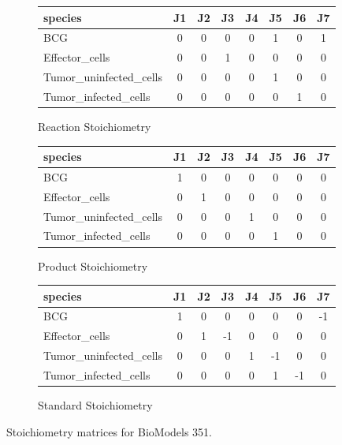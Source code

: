 \documentclass{article}
\begin{document}
\begin{figure}
\centering
\begin{subfigure}{0.7\textwidth}
{\tiny
\begin{tabular}{|l||c|c|c|c|c|c|c|}
\hline
{\bf species} & {\bf J1} & {\bf J2} & {\bf J3} & {\bf J4} & {\bf J5} & {\bf J6} & {\bf J7} \\
\hline\hline
BCG & 0 & 0 & 0 & 0 & 1 & 0 & 1\\
Effector\_cells & 0 & 0 & 1 & 0 & 0 & 0 & 0\\
Tumor\_uninfected\_cells & 0 & 0 & 0 & 0 & 1 & 0 & 0\\
Tumor\_infected\_cells & 0 & 0 & 0 & 0 & 0 & 1 & 0\\
\hline
\end{tabular}
}
    \caption{Reaction Stoichiometry}
    \label{fig:biomodels1034}
\end{subfigure}
\begin{subfigure}{0.7\textwidth}
\vspace{10pt}
{\tiny
\begin{tabular}{|l||c|c|c|c|c|c|c|}
\hline
{\bf species} & {\bf J1} & {\bf J2} & {\bf J3} & {\bf J4} & {\bf J5} & {\bf J6} & {\bf J7} \\
\hline\hline
BCG & 1 & 0 & 0 & 0 & 0 & 0 & 0\\
Effector\_cells & 0 & 1 & 0 & 0 & 0 & 0 & 0\\
Tumor\_uninfected\_cells & 0 & 0 & 0 & 1 & 0 & 0 & 0\\
Tumor\_infected\_cells & 0 & 0 & 0 & 0 & 1 & 0 & 0\\
\hline
\end{tabular}
}
 \caption{Product Stoichiometry}
\end{subfigure}
\begin{subfigure}{0.7\textwidth}
\vspace{10pt}
{\tiny
\begin{tabular}{|l||c|c|c|c|c|c|c|}
\hline
{\bf species} & {\bf J1} & {\bf J2} & {\bf J3} & {\bf J4} & {\bf J5} & {\bf J6} & {\bf J7} \\
\hline\hline
BCG & 1 & 0 & 0 & 0 & 0 & 0 & -1\\
Effector\_cells & 0 & 1 & -1 & 0 & 0 & 0 & 0\\
Tumor\_uninfected\_cells & 0 & 0 & 0 & 1 & -1 & 0 & 0\\
Tumor\_infected\_cells & 0 & 0 & 0 & 0 & 1 & -1 & 0\\
\hline
\end{tabular}
}
 \caption{Standard Stoichiometry}
\end{subfigure}
\caption{Stoichiometry matrices for BioModels 351.}
\label{fig:models}
\end{figure}
\end{document}
